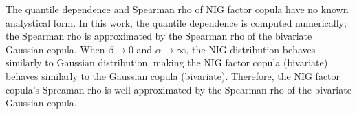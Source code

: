 The quantile dependence and Spearman rho of NIG factor copula have no known analystical form.
In this work, the quantile dependence is computed numerically; 
the Spearman rho is approximated by the Spearman rho of the bivariate Gaussian copula. 
When $\beta \rightarrow 0$ and $\alpha \rightarrow \infty$, the NIG distribution behaves similarly to Gaussian distribution, 
making the NIG factor copula (bivariate) behaves similarly to the Gaussian copula (bivariate). 
Therefore, the NIG factor copula's Spreaman rho is well approximated by the Spearman rho of the bivariate Gaussian copula.





